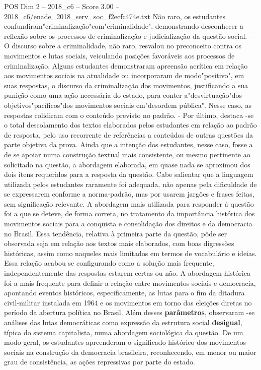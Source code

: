 \begin{textsample}{POS Dim 2 – 2018\_c6 – Score 3.00 – 2018\_c6/enade\_2018\_serv\_soc\_f2ecfc474e.txt}
Não raro, os estudantes confundiram"criminalização"com"criminalidade", demonstrando desconhecer a reflexão sobre os processos de criminalização e judicialização da questão social. - O discurso sobre a criminalidade, não raro, resvalou no preconceito contra os movimentos e lutas sociais, veiculando posições favoráveis aos processos de criminalização.
Alguns estudantes demonstraram apreensão acrítica em relação aos movimentos sociais na atualidade ou incorporaram de modo"positivo", em suas respostas, o discurso da criminalização dos movimentos, justificando a sua punição como uma ação necessária do estado, para conter a"desvirtuação"dos objetivos"pacíficos"dos movimentos sociais em"desordem pública".
Nesse caso, as respostas colidiram com o conteúdo previsto no padrão. - Por último, destaca -se o total descolamento dos textos elaborados pelos estudantes em relação ao padrão de resposta, pelo uso recorrente de referências a conteúdos de outras questões da parte objetiva da prova.
Ainda que a intenção dos estudantes, nesse caso, fosse a de se apoiar numa construção textual mais consistente, ou mesmo pertinente ao solicitado na questão, a abordagem elaborada, em quase nada se aproximou dos dois itens requeridos para a resposta da questão.
Cabe salientar que a linguagem utilizada pelos estudantes raramente foi adequada, não apenas pela dificuldade de se expressarem conforme a norma-padrão, mas por usarem jargões e frases feitas, sem significação relevante.
A abordagem mais utilizada para responder à questão foi a que se deteve, de forma correta, no tratamento da importância histórica dos movimentos sociais para a conquista e consolidação dos direitos e da democracia no Brasil.
Essa tendência, relativa à primeira parte da questão, pôde ser observada seja em relação aos textos mais elaborados, com boas digressões históricas, assim como naqueles mais limitados em termos de vocabulário e ideias.
Essa relação acabou se configurando como a solução mais frequente, independentemente das respostas estarem certas ou não.
A abordagem histórica foi a mais frequente para definir a relação entre movimentos sociais e democracia, apontando eventos históricos, especificamente, as lutas para o fim da ditadura civil-militar instalada em 1964 e os movimentos em torno das eleições diretas no período da abertura política no Brasil.
Além desses \textbf{parâmetros}, observaram -se análises das lutas democráticas como expressão da estrutura social \textbf{desigual}, típica do sistema capitalista, numa abordagem sociológica da questão.
De um modo geral, os estudantes apreenderam o significado histórico dos movimentos sociais na construção da democracia brasileira, reconhecendo, em menor ou maior grau de consistência, as ações repressivas por parte do estado.

\end{textsample}
